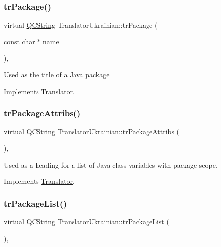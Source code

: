 \subsubsection{\texorpdfstring{trPackage()}{trPackage()}}
{\footnotesize\ttfamily virtual \mbox{\hyperlink{class_q_c_string}{Q\+C\+String}} Translator\+Ukrainian\+::tr\+Package (\begin{DoxyParamCaption}\item[{const char $\ast$}]{name }\end{DoxyParamCaption})\hspace{0.3cm}{\ttfamily [inline]}, {\ttfamily [virtual]}}

Used as the title of a Java package 

Implements \mbox{\hyperlink{class_translator}{Translator}}.

\mbox{\label{class_translator_ukrainian_ae9165d11ecc185eb84b1277f4d951077}} 
\subsubsection{\texorpdfstring{trPackageAttribs()}{trPackageAttribs()}}
{\footnotesize\ttfamily virtual \mbox{\hyperlink{class_q_c_string}{Q\+C\+String}} Translator\+Ukrainian\+::tr\+Package\+Attribs (\begin{DoxyParamCaption}{ }\end{DoxyParamCaption})\hspace{0.3cm}{\ttfamily [inline]}, {\ttfamily [virtual]}}

Used as a heading for a list of Java class variables with package scope. 

Implements \mbox{\hyperlink{class_translator}{Translator}}.

\mbox{\label{class_translator_ukrainian_a075e4e6f88927875419eeca2254d5ad1}} 
\subsubsection{\texorpdfstring{trPackageList()}{trPackageList()}}
{\footnotesize\ttfamily virtual \mbox{\hyperlink{class_q_c_string}{Q\+C\+String}} Translator\+Ukrainian\+::tr\+Package\+List (\begin{DoxyParamCaption}{ }\end{DoxyParamCaption})\hspace{0.3cm}{\ttfamily [inline]}, {\ttfamily [virtual]}}

